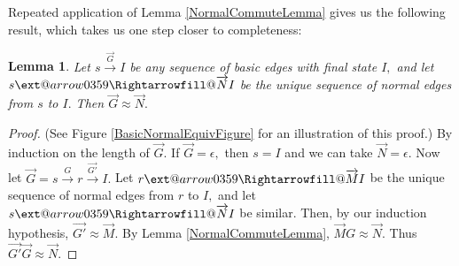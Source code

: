 \documentclass{dalthesis}
\makeatletter
\theoremstyle{theorem}
\newtheorem{lemma}[theorem]{Lemma}
\theoremstyle{definition}
\theoremstyle{definition}  %
\theoremstyle{definition}
\renewcommand{\:}{\mathbin{:}}
\newcommand{\xRightarrow}[2][]{\ext@arrow
  0359\Rightarrowfill@{#1}{#2}}
\newcommand{\edge}{\xrightarrow}
\newcommand{\nedge}{\xRightarrow}
\renewcommand{\vec}{\overrightarrow}
\makeatother
\begin{document}
Repeated application of Lemma \ref{NormalCommuteLemma} gives us the following result, which takes us one step closer to completeness:

\begin{lemma}
\label{BasicNormalEquivThm}
Let $s\edge{\vec{G}}I$ be any sequence of basic edges with final state $I,$ and let $s\nedge{\vec{N}}I$ be the unique sequence of normal edges from $s$ to $I.$ Then $\vec{G}\approx\vec{N}.$
\end{lemma}
\begin{proof} (See Figure \ref{BasicNormalEquivFigure} for an illustration of this proof.) By induction on the length of $\vec{G}.$ If $\vec{G}=\epsilon,$ then $s = I$ and we can take $\vec{N}=\epsilon.$ Now let $\vec{G} = s\edge{G}r\edge{\vec{G'}}I.$ Let $r\nedge{\vec{M}}I$ be the unique sequence of normal edges from $r$ to $I,$ and let $s\nedge{\vec{N}}I$ be similar. Then, by our induction hypothesis, $\vec{G'}\approx\vec{M}.$ By Lemma \ref{NormalCommuteLemma}, $\vec{M}G\approx\vec{N}.$ Thus $\vec{G'}\vec{G}\approx\vec{N}.$ 
\end{proof}
\end{document}
